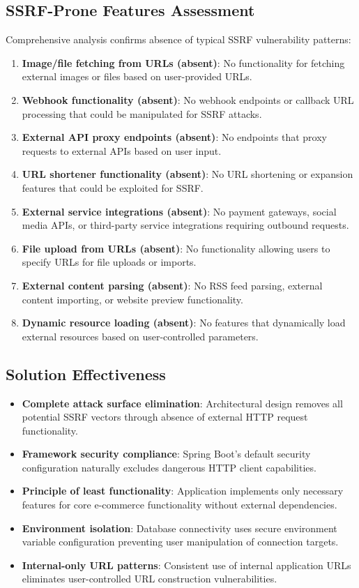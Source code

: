 \documentclass[]{UCD_CS_FYP_Report}
\begin{document}
\subsection{SSRF-Prone Features Assessment}
Comprehensive analysis confirms absence of typical SSRF vulnerability patterns:
\begin{enumerate}
	\item \textbf{Image/file fetching from URLs (absent)}: No functionality for fetching external images or files based on user-provided URLs.
	\item \textbf{Webhook functionality (absent)}: No webhook endpoints or callback URL processing that could be manipulated for SSRF attacks.
	\item \textbf{External API proxy endpoints (absent)}: No endpoints that proxy requests to external APIs based on user input.
	\item \textbf{URL shortener functionality (absent)}: No URL shortening or expansion features that could be exploited for SSRF.
	\item \textbf{External service integrations (absent)}: No payment gateways, social media APIs, or third-party service integrations requiring outbound requests.
	\item \textbf{File upload from URLs (absent)}: No functionality allowing users to specify URLs for file uploads or imports.
	\item \textbf{External content parsing (absent)}: No RSS feed parsing, external content importing, or website preview functionality.
	\item \textbf{Dynamic resource loading (absent)}: No features that dynamically load external resources based on user-controlled parameters.
\end{enumerate}

\subsection{Solution Effectiveness}
\begin{itemize}
	\item \textbf{Complete attack surface elimination}: Architectural design removes all potential SSRF vectors through absence of external HTTP request functionality.
	\item \textbf{Framework security compliance}: Spring Boot's default security configuration naturally excludes dangerous HTTP client capabilities.
	\item \textbf{Principle of least functionality}: Application implements only necessary features for core e-commerce functionality without external dependencies.
	\item \textbf{Environment isolation}: Database connectivity uses secure environment variable configuration preventing user manipulation of connection targets.
	\item \textbf{Internal-only URL patterns}: Consistent use of internal application URLs eliminates user-controlled URL construction vulnerabilities.
\end{itemize}
\end{document}
